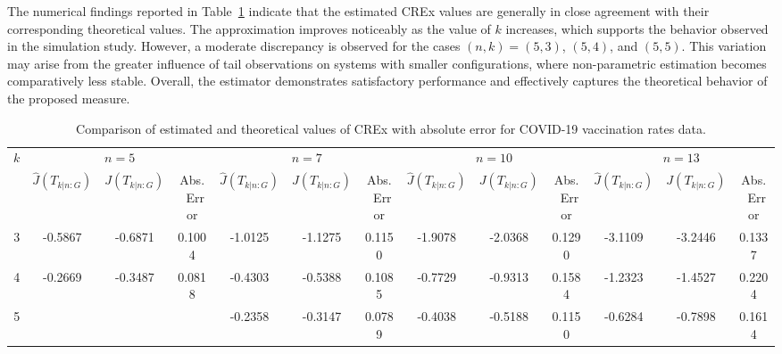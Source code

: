 \documentclass[12pt,a4paper]{article}
\numberwithin{equation}{section}
\begin{document}
The numerical findings reported in Table~\ref{tab4} indicate that the estimated CREx values are generally in close agreement with their corresponding theoretical values. The approximation improves noticeably as the value of $k$ increases, which supports the behavior observed in the simulation study. However, a moderate discrepancy is observed for the cases $(n,k)=(5,3)$, $(5,4)$, and $(5,5)$. This variation may arise from the greater influence of tail observations on systems with smaller configurations, where non-parametric estimation becomes comparatively less stable. Overall, the estimator demonstrates satisfactory performance and effectively captures the theoretical behavior of the proposed measure. 
\begin{table}
\centering
\caption{Comparison of estimated  and theoretical values of CREx with absolute error for COVID-19 vaccination rates data.}
\label{tab4}

\renewcommand{\arraystretch}{1.5}
\setlength{\tabcolsep}{7pt}

\scriptsize

\begin{tabular}{c ccc ccc ccc ccc}
\toprule

\multirow{2}{*}{$k$}

& \multicolumn{3}{c}{$n=5$}
& \multicolumn{3}{c}{$n=7$}
& \multicolumn{3}{c}{$n=10$}
& \multicolumn{3}{c}{$n=13$} \\

\cmidrule(lr){2-4}
\cmidrule(lr){5-7}
\cmidrule(lr){8-10}
\cmidrule(lr){11-13}

& $\hat J(T_{k|n:G})$
& $J(T_{k|n:G})$
& Abs.\ Error

& $\hat J(T_{k|n:G})$
& $J(T_{k|n:G})$
& Abs.\ Error

& $\hat J(T_{k|n:G})$
& $J(T_{k|n:G})$
& Abs.\ Error

& $\hat J(T_{k|n:G})$
& $J(T_{k|n:G})$
& Abs.\ Error
\\

\midrule

3
& -0.5867 & -0.6871 & 0.1004
& -1.0125 & -1.1275 & 0.1150
& -1.9078 & -2.0368 & 0.1290
& -3.1109 & -3.2446 & 0.1337
\\

4
& -0.2669 & -0.3487 & 0.0818
& -0.4303 & -0.5388 & 0.1085
& -0.7729 & -0.9313 & 0.1584
& -1.2323 & -1.4527 & 0.2204
\\

5
&         &         &
& -0.2358 & -0.3147 & 0.0789
& -0.4038 & -0.5188 & 0.1150
& -0.6284 & -0.7898 & 0.1614
\\


\end{tabular}
\end{table}
\end{document}
